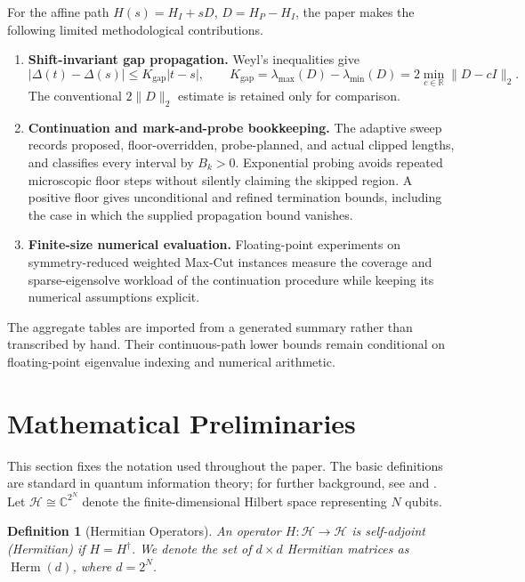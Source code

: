 \documentclass[11pt, a4paper]{article}
\newtheorem{definition}[theorem]{Definition}
\newcommand{\hilb}{\mathcal{H}}
\newcommand{\norm}[1]{\| #1 \|}
\newcommand{\Herm}{\operatorname{Herm}}
\begin{document}
For the affine path $H(s)=H_I+sD$, $D=H_P-H_I$, the paper makes the following limited methodological contributions.
\begin{enumerate}
    \item \textbf{Shift-invariant gap propagation.} Weyl's inequalities give
    \begin{equation}
    |\Delta(t)-\Delta(s)|\le K_{\mathrm{gap}}|t-s|,
    \qquad
    K_{\mathrm{gap}}=\lambda_{\max}(D)-\lambda_{\min}(D)
    =2\min_{c\in\mathbb R}\norm{D-cI}_2.
    \end{equation}
    The conventional $2\norm{D}_2$ estimate is retained only for comparison.

    \item \textbf{Continuation and mark-and-probe bookkeeping.} The adaptive sweep records proposed, floor-overridden, probe-planned, and actual clipped lengths, and classifies every interval by $B_k>0$. Exponential probing avoids repeated microscopic floor steps without silently claiming the skipped region. A positive floor gives unconditional and refined termination bounds, including the case in which the supplied propagation bound vanishes.

    \item \textbf{Finite-size numerical evaluation.} Floating-point experiments on symmetry-reduced weighted Max-Cut instances measure the coverage and sparse-eigensolve workload of the continuation procedure while keeping its numerical assumptions explicit.

\end{enumerate}

The aggregate tables are imported from a generated summary rather than transcribed by hand. Their continuous-path lower bounds remain conditional on floating-point eigenvalue indexing and numerical arithmetic.

\section{Mathematical Preliminaries}

This section fixes the notation used throughout the paper. The basic definitions are standard in quantum information theory; for further background, see \cite{Nielsen_Chuang_2010} and \cite{Watrous_2018}. Let $\hilb \cong \mathbb{C}^{2^N}$ denote the finite-dimensional Hilbert space representing $N$ qubits.
\begin{definition}[Hermitian Operators]
An operator $H: \hilb \to \hilb$ is self-adjoint (Hermitian) if $H = H^\dagger$. We denote the set of $d \times d$ Hermitian matrices as $\Herm(d)$, where $d = 2^N$.
\end{definition}
\end{document}
